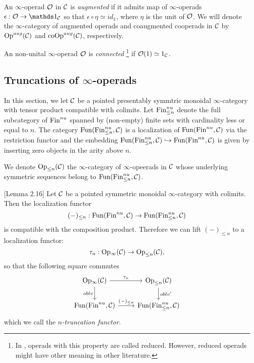 \begin{definition}
	An $\infty$-operad ${\mathcal{O}}$ in ${\mathcal{C}}$ is \emph{augmented} if it admits map of $\infty$-operads $\epsilon:\CO\rightarrow \triv_{\CC}$ so that $\epsilon\circ \eta\simeq id_{\mathds{1}}$, where $\eta$ is the unit of ${\mathcal{O}}$. We will denote the $\infty$-category of augmented operads and coaugmented cooperads in ${\mathcal{C}}$ by $\operatorname{Op}^{aug}({\mathcal{C}})$ and $\operatorname{coOp}^{aug}({\mathcal{C}})$, respectively.

\end{definition}

\begin{definition}
	An non-unital $\infty$-operad ${\mathcal{O}}$ is \emph{connected} \footnote{In \cite{ChingBar}, operads with this property are called reduced. However, reduced operads might have other meaning in other literature.}  if ${\mathcal{O}}(1)\simeq 1_{{\mathcal{C}}}$. 
\end{definition}


\subsection{Truncations of $\infty$-operads}
In this section, we let ${\mathcal{C}}$ be a pointed presentably symmtric monoidal $\infty$-category with tensor product compatible with colimits.
Let $\operatorname{Fin}^{nu}_{\leq n}$ denote the full subcategory of $\operatorname{Fin}^{nu}$ spanned by (non-empty) finite sets with cardinality less or equal to $n$.
The category $\operatorname{Fun}(\operatorname{Fin}^{nu}_{\leq n}, {\mathcal{C}})$ is a localization of $\operatorname{Fun}(\operatorname{Fin}^{nu}, {\mathcal{C}})$ via the restriction functor and the embedding $\operatorname{Fun}(\operatorname{Fin}^{nu}_{\leq n}, {\mathcal{C}}) \hookrightarrow \operatorname{Fun}(\operatorname{Fin}^{nu}, {\mathcal{C}})$ is given by inserting zero objects in the arity above $n$.
\begin{notation}
	We denote $\operatorname{Op}_{\leq n}({\mathcal{C}})$ the $\infty$-category of $\infty$-opeerads in ${\mathcal{C}}$ whose underlying symmetric sequences belong to $\operatorname{Fun}(\operatorname{Fin}^{nu}_{\leq n}, {\mathcal{C}})$.	
\end{notation}

\begin{lemma}
	\cite{Hadrianphdthesis}[Lemma 2.16]
	Let ${\mathcal{C}}$ be a pointed symmetric monoidal $\infty$-category with colimits.
	Then the localization functor
	$$
	(-)_{\leq n}: \operatorname{Fun}(\operatorname{Fin}^{nu}, {\mathcal{C}})
	\to
	\operatorname{Fun}(\operatorname{Fin}^{nu}_{\leq n}, {\mathcal{C}})
	$$
	is compatible with the composition product.
	Therefore we can lift $(-)_{\leq n}$ to a localization functor:
	$$
	\tau_{n}: \operatorname{Op_{\infty}}({\mathcal{C}})\to \operatorname{Op}_{\leq n}({\mathcal{C}}),
	$$
	so that the following square commutes
\[
\begin{tikzcd}
	\Opd(\CC)  & 
	\operatorname{Op}_{\leq n}(\CC)\\
	\Fun(\Fin^{nu}, \CC) & \Fun(\Fin^{nu}_{\leq n}, \CC)
	\arrow[from=1-1, to= 1-2, "\tau_n"]
	\arrow[from=1-1, to=2-1, "\oblv" left]
	\arrow[from=1-2, to=2-2, "\oblv'" ]
	\arrow[from=2-1, to= 2-2, "(-)_{\leq n}"]
\end{tikzcd}
\]
	which we call the \emph{$n$-truncation functor}.
\end{lemma}


